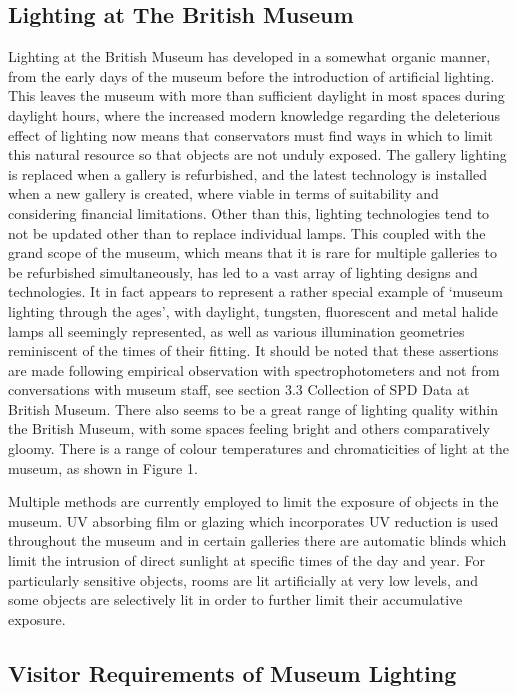 \subsection{Lighting at The British Museum}

Lighting at the British Museum has developed in a somewhat organic manner, from the early days of the museum before the introduction of artificial lighting. This leaves the museum with more than sufficient daylight in most spaces during daylight hours, where the increased modern knowledge regarding the deleterious effect of lighting now means that conservators must find ways in which to limit this natural resource so that objects are not unduly exposed. 
The gallery lighting is replaced when a gallery is refurbished, and the latest technology is installed when a new gallery is created, where viable in terms of suitability and considering financial limitations. Other than this, lighting technologies tend to not be updated other than to replace individual lamps. This coupled with the grand scope of the museum, which means that it is rare for multiple galleries to be refurbished simultaneously, has led to a vast array of lighting designs and technologies. It in fact appears to represent a rather special example of `museum lighting through the ages', with daylight, tungsten, fluorescent and metal halide lamps all seemingly represented, as well as various illumination geometries reminiscent of the times of their fitting. It should be noted that these assertions are made following empirical observation with spectrophotometers and not from conversations with museum staff, see section 3.3 Collection of \gls{SPD} Data at British Museum.
There also seems to be a great range of lighting quality within the British Museum, with some spaces feeling bright and others comparatively gloomy. There is a range of colour temperatures and chromaticities of light at the museum, as shown in Figure 1.

Multiple methods are currently employed to limit the exposure of objects in the museum. UV absorbing film or glazing which incorporates UV reduction is used throughout the museum and in certain galleries there are automatic blinds which limit the intrusion of direct sunlight at specific times of the day and year. For particularly sensitive objects, rooms are lit artificially at very low levels, and some objects are selectively lit in order to further limit their accumulative exposure.

\subsection{Visitor Requirements of Museum Lighting}

